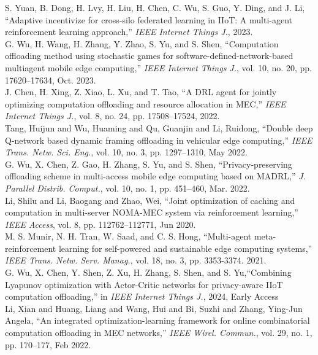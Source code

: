 \documentclass[12pt,draftclsnofoot,onecolumn]{IEEEtran}
\newenvironment{my}[2]%
{\begin{list}{}%
{\setlength{\rightmargin}{#1}\setlength{\leftmargin}{#2}}%


 \item[]{}

} {\end{list}}
\begin{document}
\begin{enumerate}
\begin{my}{1cm}{1cm}
{{			\cite{yuan2023adaptive} S. Yuan, B. Dong, H. Lvy, H. Liu, H. Chen, C. Wu, S. Guo, Y. Ding, and J. Li, ``Adaptive incentivize for cross-silo federated learning in IIoT: A multi-agent reinforcement learning approach,'' \textit{IEEE Internet Things J.}, 2023.\\[6pt]
			\cite{wu2023computation} G. Wu, H. Wang, H. Zhang, Y. Zhao, S. Yu, and S. Shen, ``Computation offloading method using stochastic games for software-defined-network-based multiagent mobile edge computing,'' \textit{IEEE Internet Things J.}, vol. 10, no. 20, pp. 17620–17634, Oct. 2023.\\[6pt]
			\cite{chen2021drl} J. Chen, H. Xing, Z. Xiao, L. Xu, and T. Tao, ``A DRL agent for jointly optimizing computation offloading and resource allocation in MEC,'' \textit{IEEE Internet Things J.}, vol. 8, no. 24, pp. 17508--17524, 2022.\\[6pt]
			\cite{tang2022double} Tang, Huijun and Wu, Huaming and Qu, Guanjin and Li, Ruidong, ``Double deep Q-network based dynamic framing offloading in vehicular edge computing,'' \textit{IEEE Trans. Netw. Sci. Eng.}, vol. 10, no. 3, pp. 1297--1310, May 2022.\\[6pt]
			\cite{wu2024privacy} G. Wu, X. Chen, Z. Gao, H. Zhang, S. Yu, and S. Shen, ``Privacy-preserving offloading scheme in multi-access mobile edge computing based on MADRL,'' \textit{J. Parallel Distrib. Comput.}, vol. 10, no. 1, pp. 451--460, Mar. 2022.\\[6pt]
			\cite{li2020joint} Li, Shilu and Li, Baogang and Zhao, Wei, ``Joint optimization of caching and computation in multi-server NOMA-MEC system via reinforcement learning,'' \textit{IEEE Access}, vol. 8, pp. 112762--112771, Jun 2020.\\[6pt]
			\cite{munir2021multi} M. S. Munir, N. H. Tran, W. Saad, and C. S. Hong, ``Multi-agent meta-reinforcement learning for self-powered and sustainable edge computing systems,'' \textit{IEEE Trans. Netw. Serv. Manag.}, vol. 18, no. 3, pp. 3353-3374. 2021.\\[6pt]
			\cite{wu2024combining} G. Wu, X. Chen, Y. Shen, Z. Xu, H. Zhang, S. Shen, and S. Yu,``Combining Lyapunov optimization with Actor-Critic networks for privacy-aware IIoT computation offloading,'' in \textit{IEEE Internet Things J.}, 2024, Early Access\\[6pt]
			\cite{li2022integrated} Li, Xian and Huang, Liang and Wang, Hui and Bi, Suzhi and Zhang, Ying-Jun Angela, ``An integrated optimization-learning framework for online combinatorial computation offloading in MEC networks,'' \textit{IEEE Wirel. Commun.}, vol. 29, no. 1, pp. 170--177, Feb 2022.\\[6pt]
}}
\end{my}
\end{enumerate}
\end{document}
